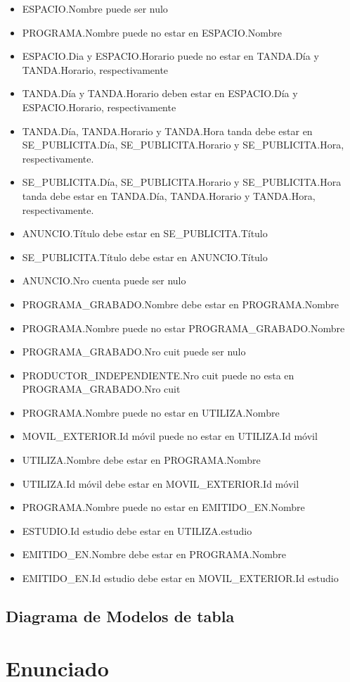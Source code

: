 \documentclass[a4paper,10pt]{article}
\begin{document}
    \begin{itemize}
     \item ESPACIO.Nombre puede ser nulo
     \item PROGRAMA.Nombre puede no estar en ESPACIO.Nombre
     
     \item ESPACIO.Dia y ESPACIO.Horario puede no estar en TANDA.D\'ia y TANDA.Horario, respectivamente
     \item TANDA.D\'ia y TANDA.Horario deben estar en ESPACIO.D\'ia y ESPACIO.Horario, respectivamente
     
     \item TANDA.D\'ia, TANDA.Horario y TANDA.Hora tanda debe estar en \newline SE\_PUBLICITA.D\'ia, SE\_PUBLICITA.Horario 
      y SE\_PUBLICITA.Hora, respectivamente.
     \item SE\_PUBLICITA.D\'ia, SE\_PUBLICITA.Horario y SE\_PUBLICITA.Hora \newline tanda debe estar en TANDA.D\'ia, TANDA.Horario 
      y TANDA.Hora, respectivamente.
     \item ANUNCIO.T\'itulo debe estar en SE\_PUBLICITA.T\'itulo
     \item SE\_PUBLICITA.T\'itulo debe estar en ANUNCIO.T\'itulo
     
     \item ANUNCIO.Nro cuenta puede ser nulo

     \item PROGRAMA\_GRABADO.Nombre debe estar en PROGRAMA.Nombre
     \item PROGRAMA.Nombre puede no estar PROGRAMA\_GRABADO.Nombre

     \item PROGRAMA\_GRABADO.Nro cuit puede ser nulo
     \item PRODUCTOR\_INDEPENDIENTE.Nro cuit puede no esta en PROGRAMA\_GRABADO.Nro cuit

     \item PROGRAMA.Nombre puede no estar en UTILIZA.Nombre
     \item MOVIL\_EXTERIOR.Id m\'ovil puede no estar en UTILIZA.Id m\'ovil
     \item UTILIZA.Nombre debe estar en PROGRAMA.Nombre
     \item UTILIZA.Id m\'ovil debe estar en MOVIL\_EXTERIOR.Id m\'ovil

     \item PROGRAMA.Nombre puede no estar en EMITIDO\_EN.Nombre
     \item ESTUDIO.Id estudio debe estar en UTILIZA.estudio
     \item EMITIDO\_EN.Nombre debe estar en PROGRAMA.Nombre
     \item EMITIDO\_EN.Id estudio debe estar en MOVIL\_EXTERIOR.Id estudio
    \end{itemize}

  \subsection{Diagrama de Modelos de tabla}
    \begin{flushleft}
    \end{flushleft}

\appendix
\newpage
\section{Enunciado}
  
\end{document}
